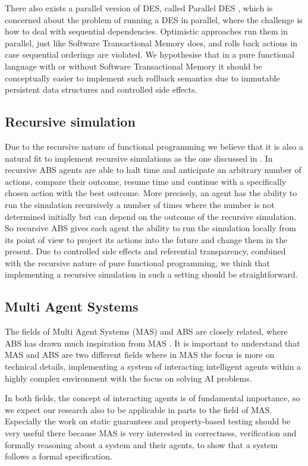 There also exists a parallel version of DES, called Parallel DES \cite{fujimoto_parallel_2017}, which is concerned about the problem of running a DES in parallel, where the challenge is how to deal with sequential dependencies. Optimistic approaches run them in parallel, just like Software Transactional Memory does, and rolls back actions in case sequential orderings are violated. We hypothesise that in a pure functional language with or without Software Transactional Memory it should be conceptually easier to implement such rollback semantics due to immutable persistent data structures and controlled side effects.
 
\subsection{Recursive simulation}
Due to the recursive nature of functional programming we believe that it is also a natural fit to implement recursive simulations as the one discussed in \cite{gilmer_recursive_2000}. In recursive ABS agents are able to halt time and anticipate an arbitrary number of actions, compare their outcome, resume time and continue with a specifically chosen action with the best outcome. More precisely, an agent has the ability to run the simulation recursively a number of times where the number is not determined initially but can depend on the outcome of the recursive simulation. So recursive ABS gives each agent the ability to run the simulation locally from its point of view to project its actions into the future and change them in the present. Due to controlled side effects and referential transparency, combined with the recursive nature of pure functional programming, we think that implementing a recursive simulation in such a setting should be straightforward.

\subsection{Multi Agent Systems}
The fields of Multi Agent Systems (MAS) and ABS are closely related, where ABS has drawn much inspiration from MAS \cite{weiss_multiagent_2013,wooldridge_introduction_2009}. It is important to understand that MAS and ABS are two different fields where in MAS the focus is more on technical details, implementing a system of interacting intelligent agents within a highly complex environment with the focus on solving AI problems.

In both fields, the concept of interacting agents is of fundamental importance, so we expect our research also to be applicable in parts to the field of MAS. Especially the work on static guarantees and property-based testing should be very useful there because MAS is very interested in correctness, verification and formally reasoning about a system and their agents, to show that a system follows a formal specification.